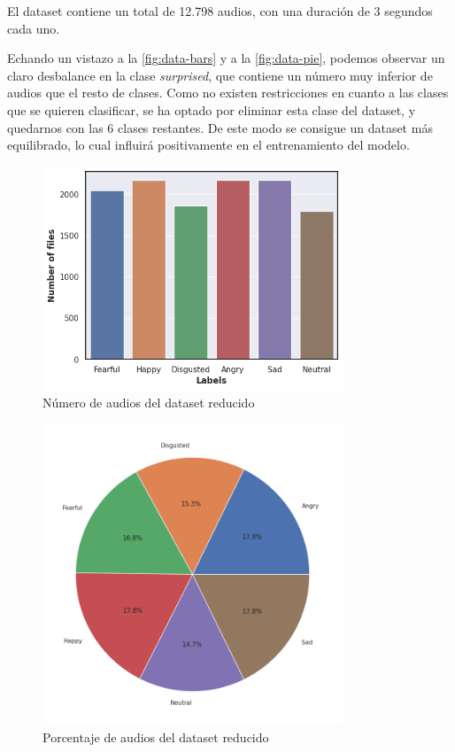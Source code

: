 El dataset contiene un total de 12.798 audios, con una duración de 3 segundos cada uno.

Echando un vistazo a la \autoref{fig:data-bars} y a la \autoref{fig:data-pie}, podemos observar un claro desbalance en la clase \textit{surprised}, que contiene un número muy inferior de audios que el resto de clases.
Como no existen restricciones en cuanto a las clases que se quieren clasificar, se ha optado por eliminar esta clase del dataset, y quedarnos con las 6 clases restantes.
De este modo se consigue un dataset más equilibrado, lo cual influirá positivamente en el entrenamiento del modelo.

\begin{figure}[htpb]
    \centering
    \includegraphics[width=0.8\textwidth]{cap2/images/dataset-bars-small.png}
    \caption{Número de audios del dataset reducido}
    \label{fig:data-bars-small}
\end{figure}

\begin{figure}[htpb]
    \centering
    \includegraphics[width=0.8\textwidth]{cap2/images/dataset-pie-small.png}
    \caption{Porcentaje de audios del dataset reducido}
    \label{fig:data-pie-small}
\end{figure}

